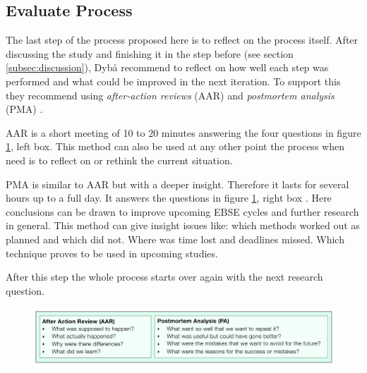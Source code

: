 
\subsection{Evaluate Process}
\label{subsec:evaluate process}

The last step of the process proposed here is to reflect on the process itself. After discussing the study and finishing it in the step before (see section \ref{subsec:discussion}), Dyb{\aa} \etal recommend to reflect on how well each step was performed and what could be improved in the next iteration. To support this they recommend using \emph{after-action reviews} (AAR) and \emph{postmortem analysis} (PMA) \cite{Dyba2005}.

AAR is a short meeting of 10 to 20 minutes answering the four questions in figure \ref{fig:aar_pma}, left box. This method can also be used at any other point the process when need is to reflect on or rethink the current situation\cite{Dyba2005}.

PMA is similar to AAR but with a deeper insight. Therefore it lasts for several hours up to a full day. It answers the questions in figure \ref{fig:aar_pma}, right box \cite{Dyba2005}. Here conclusions can be drawn to improve upcoming EBSE cycles and further research in general. This method can give insight issues like: which methods worked out as planned and which did not. Where was time lost and deadlines missed. Which technique proves to be used in upcoming studies. 

After this step the whole process starts over again with the next research question.

\begin{figure}
	\centering
	\includegraphics[width=12.5cm]{figures/aar_pma.pdf}
	\caption{}
	\label{fig:aar_pma}
\end{figure}
